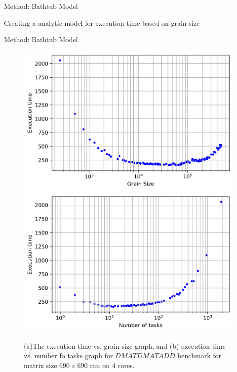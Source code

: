 \documentclass[10pt]{beamer}
\begin{document}
\begin{frame}{Method: Bathtub Model}
	\begin{outline}
		Creating a analytic model for execution time based on grain size
	\end{outline}
\end{frame}


\begin{frame}{Method: Bathtub Model}
	\begin{outline}
\begin{figure}[H]
	\centering
	{\includegraphics[scale=.3]{images/bathtub/all_690_4.png}\label{fig20:a}}
	{\includegraphics[scale=.3]{images/bathtub/tasks_all_690_4.png}\label{fig20:b}}
	\caption{(a)The execution time vs. grain size graph, and (b) execution time vs. number fo tasks graph for $DMATDMATADD$ benchmark for matrix size $690\times690$ ran on $4$ cores.}	
	\label{fig21}
\end{figure}
	\end{outline}
\end{frame}	
\end{document}
